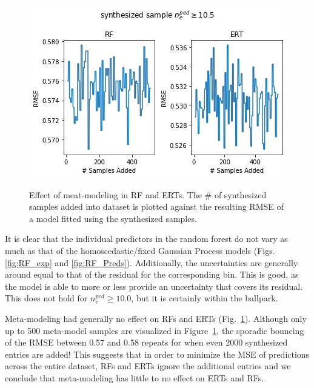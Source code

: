 \documentclass[a4paper, twoside, final, 12pt]{article}
\begin{document}
{\begin{figure}
		\centering
		\vspace{-18pt}
		\caption{Effect of meat-modeling in RF and ERTs. The \# of synthesized samples added into dataset is plotted against the resulting RMSE of a model fitted using the synthesized samples.}
		\includegraphics[width=\linewidth, keepaspectratio=true, trim=0 0 0 30, clip]{./src/ERT_vs_RF_meta_modeling}
		\vspace{-22pt}
		\label{fig:RF_meta_model}
\end{figure}
It is clear that the individual predictors in the random forest do not vary as much as that of the homoscedastic/fixed Gaussian Process models (Figs. \ref{fig:RF_exp} and \ref{fig:RF_Preds}).
Additionally, the uncertainties are generally around equal to that of the residual for the corresponding bin. This is good, as the model is able to more or less provide an uncertainty that covers its residual. This does not hold for $n_e^{ped} \geq 10.0$, but it is certainly within the ballpark. 

Meta-modeling had generally no effect on RFs and ERTs (Fig.~\ref{fig:RF_meta_model}).
Although only up to 500 meta-model samples are visualized in Figure~\ref{fig:RF_meta_model}, the sporadic bouncing of the RMSE between 0.57 and 0.58 repeats for when even 2000 synthesized entries are added!
This suggests that in order to minimize the MSE of predictions across the entire dataset, RFs and ERTs ignore the additional entries and we conclude that meta-modeling has little to no effect on ERTs and RFs.


}
\end{document}

